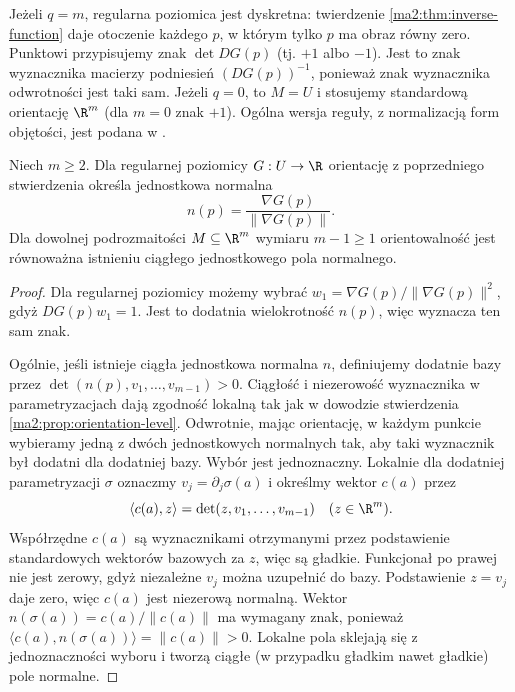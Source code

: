 Jeżeli $q=m$, regularna poziomica jest dyskretna:
twierdzenie \ref{ma2:thm:inverse-function} daje
otoczenie każdego $p$, w którym tylko $p$ ma obraz
równy zero. Punktowi przypisujemy znak $\det DG(p)$
(tj. $+1$ albo $-1$). Jest to znak wyznacznika
macierzy podniesień $(DG(p))^{-1}$, ponieważ znak
wyznacznika odwrotności jest taki sam.
Jeżeli $q=0$, to $M=U$ i stosujemy standardową
orientację $\R^m$ (dla $m=0$ znak $+1$).
Ogólna wersja reguły, z normalizacją form objętości,
jest podana w
.

\begin{wniosek}
\label{ma2:cor:orientation-normal}
Niech $m\ge2$. Dla regularnej poziomicy
$G:U\to\R$ orientację
z poprzedniego stwierdzenia określa jednostkowa
normalna
\[
 n(p)=\frac{\nabla G(p)}{\|\nabla G(p)\|}.
\]
Dla dowolnej podrozmaitości $M\subseteq\R^m$
wymiaru $m-1\ge1$ orientowalność jest równoważna
istnieniu ciągłego jednostkowego pola normalnego.
\end{wniosek}
\begin{proof}
Dla regularnej poziomicy możemy wybrać
$w_1=\nabla G(p)/\|\nabla G(p)\|^2$,
gdyż $DG(p)w_1=1$. Jest to dodatnia wielokrotność
$n(p)$, więc wyznacza ten sam znak.

Ogólnie, jeśli istnieje ciągła jednostkowa normalna
$n$, definiujemy dodatnie bazy przez
$\det(n(p),v_1,\ldots,v_{m-1})>0$. Ciągłość
i niezerowość wyznacznika w parametryzacjach
dają zgodność lokalną tak jak w dowodzie
stwierdzenia \ref{ma2:prop:orientation-level}.
Odwrotnie, mając orientację, w każdym punkcie
wybieramy jedną z dwóch jednostkowych normalnych
tak, aby taki wyznacznik był dodatni dla dodatniej
bazy. Wybór jest jednoznaczny.
Lokalnie dla dodatniej parametryzacji $\sigma$
oznaczmy $v_j=\partial_j\sigma(a)$ i określmy
wektor $c(a)$ przez
\[
 \langle c(a),z\rangle=\det(z,v_1,\ldots,v_{m-1})
 \quad(z\in\R^m).
\]
Współrzędne $c(a)$ są wyznacznikami otrzymanymi
przez podstawienie standardowych wektorów bazowych
za $z$, więc są gładkie. Funkcjonał po prawej
nie jest zerowy, gdyż niezależne $v_j$ można
uzupełnić do bazy. Podstawienie $z=v_j$ daje zero,
więc $c(a)$ jest niezerową normalną.
Wektor $n(\sigma(a))=c(a)/\|c(a)\|$ ma wymagany
znak, ponieważ $\langle c(a),n(\sigma(a))\rangle
=\|c(a)\|>0$. Lokalne pola sklejają się
z jednoznaczności wyboru i tworzą ciągłe
(w przypadku gładkim nawet gładkie) pole normalne.
\end{proof}

